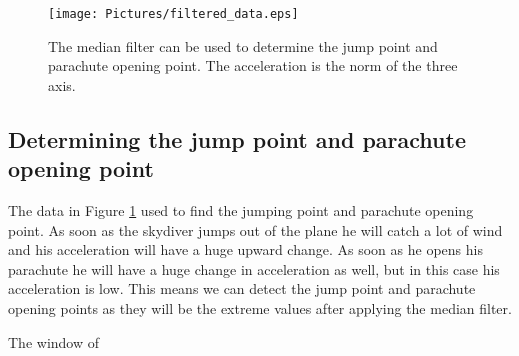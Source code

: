 \begin{figure}
  \centering
  \texttt{[image: Pictures/filtered\_data.eps]}
  \caption{The median filter can be used to determine the jump point and parachute opening point. The acceleration is the norm of the three axis.}
  \label{fig:filtered_data}
\end{figure}

\subsection{Determining the jump point and parachute opening point}
The data in Figure \ref{fig:filtered_data} used to find the jumping point and parachute opening point. As soon as the skydiver jumps out of the plane he will catch a lot of wind and his acceleration will have a huge upward change. As soon as he opens his parachute he will have a huge change in acceleration as well, but in this case his acceleration is low. This means we can detect the jump point and parachute opening points as they will be the extreme values after applying the median filter.

The window of